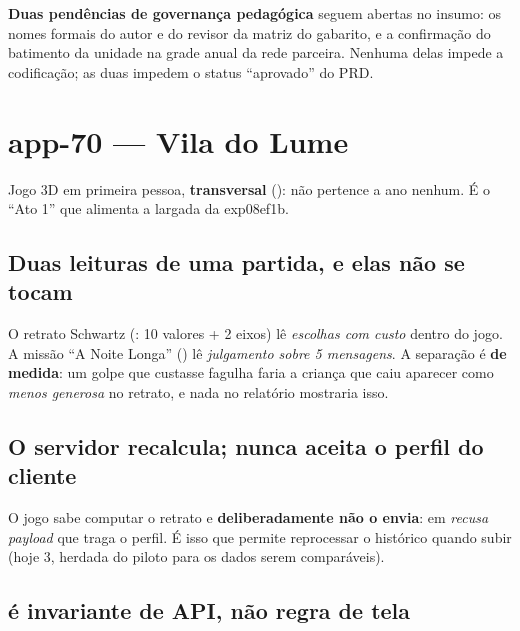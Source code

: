 \begin{limitacao}
\textbf{Duas pendências de governança pedagógica} seguem abertas no insumo:
os nomes formais do autor e do revisor da matriz do gabarito, e a confirmação do
batimento da unidade na grade anual da rede parceira. Nenhuma delas impede a
codificação; as duas impedem o status \enquote{aprovado} do PRD.
\end{limitacao}


\section{app-70 --- Vila do Lume}

Jogo 3D em primeira pessoa, \textbf{transversal} (): não pertence a
ano nenhum. É o \enquote{Ato 1} que alimenta a largada da exp08ef1b.

\subsection{Duas leituras de uma partida, e elas não se tocam}

\begin{regra}
O retrato Schwartz (: 10 valores + 2 eixos) lê \emph{escolhas
com custo} dentro do jogo. A missão \enquote{A Noite Longa}
() lê \emph{julgamento sobre 5 mensagens}. A separação é
\textbf{de medida}: um golpe que custasse fagulha faria a criança que caiu
aparecer como \emph{menos generosa} no retrato, e nada no relatório mostraria
isso.
\end{regra}

\subsection{O servidor recalcula; nunca aceita o perfil do cliente}

\begin{regra}
O jogo sabe computar o retrato e \textbf{deliberadamente não o envia}:
 em  \emph{recusa} \emph{payload}
que traga o perfil. É isso que permite reprocessar o histórico quando
 subir (hoje 3, herdada do piloto para os dados serem
comparáveis).
\end{regra}

\subsection{ é invariante de API, não regra de tela}

